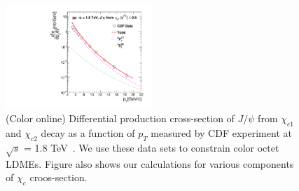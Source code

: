 \documentclass[aps,prc,preprint,superscriptaddress,showpacs,showkeys,amsmath]{revtex4-1}
\begin{document}
\begin{figure}
\includegraphics[width=0.49\textwidth]{Figures/Chic/Chic1_CDF_Fit.pdf}
\caption{(Color online) Differential production cross-section of $J/\psi$ from
$\chi_{c1}$ and $\chi_{c2}$ decay as a function of $p_{T}$ measured by CDF experiment at $\sqrt{s}$ = 1.8 TeV~\cite{Abe:1997yz}. 
We use these data sets to constrain color octet LDMEs. Figure also shows our calculations for various components 
of $\chi_{c}$ croos-section.}
\label{Fig:LDMEChicCDF}
\end{figure}


\end{document}
